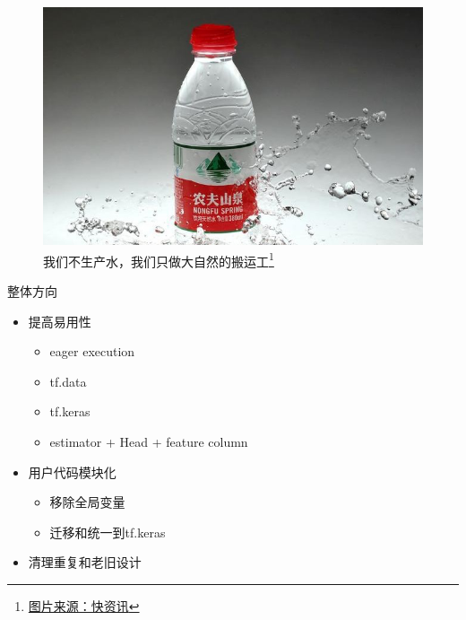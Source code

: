





\createtitle

\begin{frame}
    \begin{figure}[!tb]
        \includegraphics[width=\onepicwidth]{figure/water}
        \caption{我们不生产水，我们只做大自然的搬运工\footnote{
                 \href{http://sh.qihoo.com/pc/967ac7a2370f8fc79?sign=360_e39369d1}{图片来源：快资讯}}}
    \end{figure}
\end{frame}

\begin{frame}{整体方向}
    \begin{itemize}
        \item 提高易用性
            \begin{itemize}
                \item eager execution
                \item tf.data
                \item tf.keras
                \item estimator + Head + feature column
            \end{itemize}
        \item 用户代码模块化
            \begin{itemize}
                \item 移除全局变量
                \item 迁移和统一到tf.keras
            \end{itemize}
        \item 清理重复和老旧设计
    \end{itemize}
\end{frame}

\createoutline



\createlastpage


